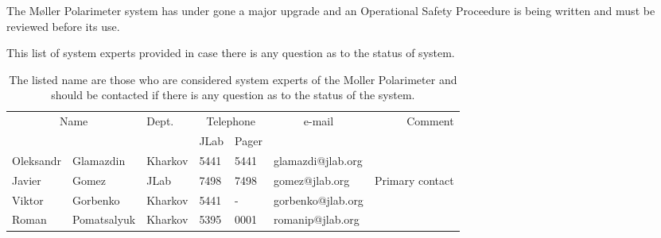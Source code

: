 

The M{\o}ller Polarimeter system has under gone a major upgrade and an Operational Safety Proceedure
is being written and must be reviewed before its use.


\label{sec:moller-pers}

This list of system experts provided in case there is any question as to the status of system.

\begin{table}[h]
\begin{center}
\begin{tabular}{|ll|l|l|l|l|r|} \hline
  \multicolumn{2}{|c|}{Name} & Dept. & \multicolumn{2}{c|}{Telephone} & 
  \multicolumn{1}{c|}{e-mail} & Comment \\ 
  \cline{4-5}
   &  &   & JLab & Pager &  & \\ 
\hline
 Oleksandr    & Glamazdin       & Kharkov & 5441 & 5441 & glamazdi@jlab.org &  \\ 
 Javier       & Gomez           & JLab    & 7498 & 7498 & gomez@jlab.org    & Primary contact     \\ 
 Viktor       & Gorbenko        & Kharkov & 5441 &   -  & gorbenko@jlab.org &  \\ 
 Roman        & Pomatsalyuk     & Kharkov & 5395 & 0001 & romanip@jlab.org  &  \\ 
\hline
\end{tabular}
\end{center}
\caption[Moller Polarimeter: authorized personnel]{
   The listed name are those who are considered system experts of the Moller Polarimeter and should be contacted
   if there is any question as to the status of the system.
}
\label{tab:moller:personnel}
\end{table}

